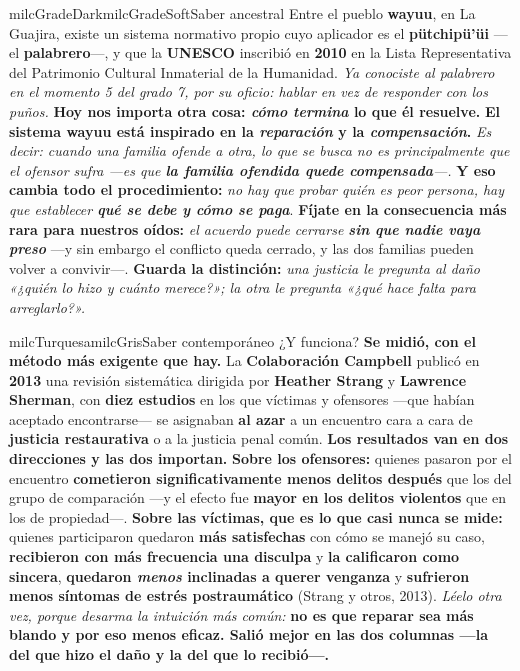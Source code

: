 \documentclass[11pt,letterpaper]{article}
\begin{document}
\begin{softbox}{milcGradeDark}{milcGradeSoft}{Saber ancestral}
Entre el pueblo \textbf{wayuu}, en La Guajira, existe un sistema normativo propio cuyo aplicador es el \textbf{pütchipü'üi} ---el \textbf{palabrero}---, y que la \textbf{UNESCO} inscribió en \textbf{2010} en la Lista Representativa del Patrimonio Cultural Inmaterial de la Humanidad. \emph{Ya conociste al palabrero en el momento 5 del grado 7, por su oficio: hablar en vez de responder con los puños.} \textbf{Hoy nos importa otra cosa: \emph{cómo termina} lo que él resuelve.} \textbf{El sistema wayuu está inspirado en la \emph{reparación} y la \emph{compensación}.} \emph{Es decir: cuando una familia ofende a otra, lo que se busca no es principalmente que el ofensor sufra ---es que \textbf{la familia ofendida quede compensada}---.} \textbf{Y eso cambia todo el procedimiento:} \emph{no hay que probar quién es peor persona, hay que establecer \textbf{qué se debe y cómo se paga}}. \textbf{Fíjate en la consecuencia más rara para nuestros oídos:} \emph{el acuerdo puede cerrarse \textbf{sin que nadie vaya preso}} ---y sin embargo el conflicto queda cerrado, y las dos familias pueden volver a convivir---. \textbf{Guarda la distinción:} \emph{una justicia le pregunta al daño «¿quién lo hizo y cuánto merece?»; la otra le pregunta «¿qué hace falta para arreglarlo?».}
\end{softbox}

\begin{softbox}{milcTurquesa}{milcGris}{Saber contemporáneo}
¿Y funciona? \textbf{Se midió, con el método más exigente que hay.} La \textbf{Colaboración Campbell} publicó en \textbf{2013} una revisión sistemática dirigida por \textbf{Heather Strang} y \textbf{Lawrence Sherman}, con \textbf{diez estudios} en los que víctimas y ofensores ---que habían aceptado encontrarse--- se asignaban \textbf{al azar} a un encuentro cara a cara de \textbf{justicia restaurativa} o a la justicia penal común. \textbf{Los resultados van en dos direcciones y las dos importan.} \textbf{Sobre los ofensores:} quienes pasaron por el encuentro \textbf{cometieron significativamente menos delitos después} que los del grupo de comparación ---y el efecto fue \textbf{mayor en los delitos violentos} que en los de propiedad---. \textbf{Sobre las víctimas, que es lo que casi nunca se mide:} quienes participaron quedaron \textbf{más satisfechas} con cómo se manejó su caso, \textbf{recibieron con más frecuencia una disculpa} y \textbf{la calificaron como sincera}, \textbf{quedaron \emph{menos} inclinadas a querer venganza} y \textbf{sufrieron menos síntomas de estrés postraumático} (Strang y otros, 2013). \emph{Léelo otra vez, porque desarma la intuición más común:} \textbf{no es que reparar sea más blando y por eso menos eficaz. Salió mejor en las dos columnas ---la del que hizo el daño y la del que lo recibió---.}
\end{softbox}
\end{document}
